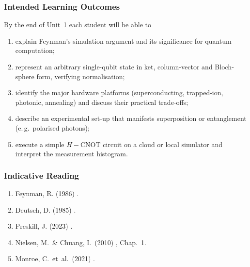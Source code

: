 \subsubsection*{Intended Learning Outcomes}\label{sec:U1-LO}
By the end of Unit 1 each student will be able to
\begin{enumerate}[label=U1-\arabic*]
	\item explain Feynman’s simulation argument and its significance for quantum computation;
	\item represent an arbitrary single-qubit state in ket, column-vector and Bloch-sphere form, verifying normalisation;
	\item identify the major hardware platforms (superconducting, trapped-ion, photonic, annealing) 
	and discuss their practical trade-offs;
	\item describe an experimental set-up that manifests superposition or entanglement (e.\,g.\ polarised photons);
	\item execute a simple $H\!-\!\mathrm{CNOT}$ circuit on a cloud or local simulator and interpret the measurement histogram.
\end{enumerate}

\subsubsection*{Indicative Reading}\label{sec:U1-reading}
\vspace{-0.4em}
\begin{enumerate}
	\item Feynman, R. (1986) \emph{}.
	\item Deutsch, D. (1985) \emph{}.
	\item Preskill, J. (2023) .
	\item Nielsen, M. \& Chuang, I.\ (2010) \emph{}, Chap.~1.
	\item Monroe, C.\ et al.\ (2021) \emph{}.
\end{enumerate}



